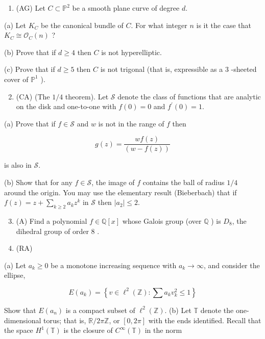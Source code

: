 \documentclass[10pt]{article}
\begin{document}
\begin{enumerate}
  \item (AG) Let $C \subset \mathbb{P}^{2}$ be a smooth plane curve of degree $d$.
\end{enumerate}

(a) Let $K_{C}$ be the canonical bundle of $C$. For what integer $n$ is it the case that $K_{C} \cong \mathcal{O}_{C}(n)$ ?

(b) Prove that if $d \geq 4$ then $C$ is not hyperelliptic.

(c) Prove that if $d \geq 5$ then $C$ is not trigonal (that is, expressible as a 3 -sheeted cover of $\mathbb{P}^{1}$ ).

\begin{enumerate}
  \setcounter{enumi}{1}
  \item (CA) (The $1 / 4$ theorem). Let $\mathcal{S}$ denote the class of functions that are analytic on the disk and one-to-one with $f(0)=0$ and $f^{\prime}(0)=1$.
\end{enumerate}

(a) Prove that if $f \in \mathcal{S}$ and $w$ is not in the range of $f$ then

$$
g(z)=\frac{w f(z)}{(w-f(z))}
$$

is also in $\mathcal{S}$.

(b) Show that for any $f \in \mathcal{S}$, the image of $f$ contains the ball of radius $1 / 4$ around the origin. You may use the elementary result (Bieberbach) that if $f(z)=z+\sum_{k \geq 2} a_{k} z^{k}$ in $\mathcal{S}$ then $\left|a_{2}\right| \leq 2$.

\begin{enumerate}
  \setcounter{enumi}{2}
  \item (A) Find a polynomial $f \in \mathbb{Q}[x]$ whose Galois group (over $\mathbb{Q}$ ) is $D_{8}$, the dihedral group of order 8 .

  \item (RA)

\end{enumerate}

(a) Let $a_{k} \geq 0$ be a monotone increasing sequence with $a_{k} \rightarrow \infty$, and consider the ellipse,

$$
E\left(a_{k}\right)=\left\{v \in \ell^{2}(\mathbb{Z}): \sum a_{k} v_{k}^{2} \leq 1\right\}
$$

Show that $E\left(a_{n}\right)$ is a compact subset of $\ell^{2}(\mathbb{Z})$.
(b) Let $\mathbb{T}$ denote the one-dimensional torus; that is, $\mathbb{R} / 2 \pi \mathbb{Z}$, or $[0,2 \pi]$ with the ends identified. Recall that the space $H^{1}(\mathbb{T})$ is the closure of $C^{\infty}(\mathbb{T})$ in the norm
\end{document}
